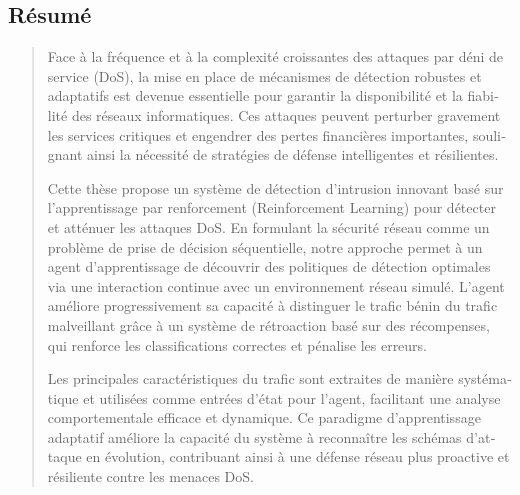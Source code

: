\documentclass{report}
\begin{document}
\newpage
\begin{otherlanguage}{french}
\chapter*{Résumé}

\begin{quote}
\large
Face à la fréquence et à la complexité croissantes des attaques par déni de service (DoS), la mise en place de mécanismes de détection robustes et adaptatifs est devenue essentielle pour garantir la disponibilité et la fiabilité des réseaux informatiques. Ces attaques peuvent perturber gravement les services critiques et engendrer des pertes financières importantes, soulignant ainsi la nécessité de stratégies de défense intelligentes et résilientes.

Cette thèse propose un système de détection d’intrusion innovant basé sur l’apprentissage par renforcement (Reinforcement Learning) pour détecter et atténuer les attaques DoS. En formulant la sécurité réseau comme un problème de prise de décision séquentielle, notre approche permet à un agent d’apprentissage de découvrir des politiques de détection optimales via une interaction continue avec un environnement réseau simulé. L’agent améliore progressivement sa capacité à distinguer le trafic bénin du trafic malveillant grâce à un système de rétroaction basé sur des récompenses, qui renforce les classifications correctes et pénalise les erreurs.

Les principales caractéristiques du trafic sont extraites de manière systématique et utilisées comme entrées d’état pour l’agent, facilitant une analyse comportementale efficace et dynamique. Ce paradigme d’apprentissage adaptatif améliore la capacité du système à reconnaître les schémas d’attaque en évolution, contribuant ainsi à une défense réseau plus proactive et résiliente contre les menaces DoS.
\end{quote}

\vspace{1em}
\end{otherlanguage}


\tableofcontents
\newpage

\listoffigures
{}
\newpage
\end{document}
